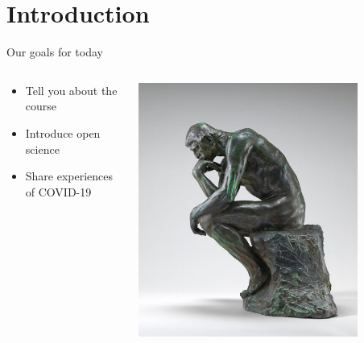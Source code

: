 \section{Introduction}
\label{sec:introduction}

\begin{frame}{Our goals for today}
    
    \begin{columns}[c]
        \begin{column}{.45\textwidth}
            \begin{itemize}
                \item Tell you about the course
                \item Introduce open science
                \item Share experiences of COVID-19
            \end{itemize}
        \end{column}
        
        \begin{column}{.45\textwidth}
            \includegraphics[width=0.8\textwidth]{images/the_thinker_NPA_1942_5_12.jpg}
            
        \end{column}
    \end{columns}
    
\end{frame}

